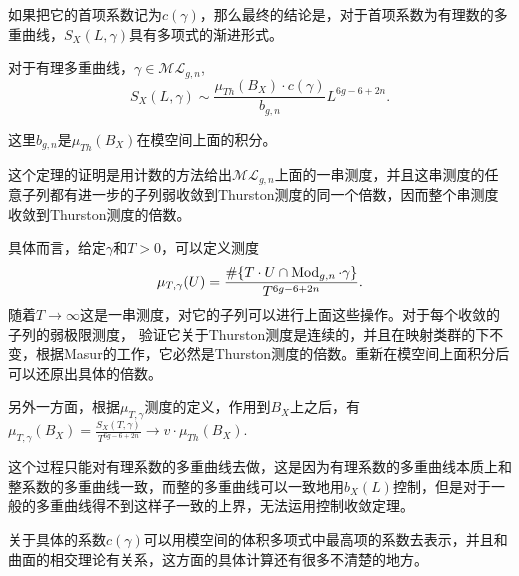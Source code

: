 如果把它的首项系数记为$c(\gamma)$，那么最终的结论是，对于首项系数为有理数的多重曲线，$S_X(L,\gamma)$具有多项式的渐进形式。

\begin{thmb}
对于有理多重曲线，$\gamma\in \mathscr{ML}_{g,n}$, $$
S_X(L,\gamma)\sim \frac{\mu_{Th}(B_X)\cdot c(\gamma)}{b_{g,n}} L^{6g-6+2n}.
$$
\end{thmb}

这里$b_{g,n}$是$\mu_{Th}(B_X)$在模空间上面的积分。

这个定理的证明是用计数的方法给出$\mathscr{ML}_{g,n}$上面的一串测度，并且这串测度的任意子列都有进一步的子列弱收敛到Thurston测度的同一个倍数，因而整个串测度收敛到Thurston测度的倍数。

具体而言，给定$\gamma$和$T>0$，可以定义测度 $$
 \mu_{T,\gamma}(U)=\frac{\#\{T\cdot U\cap \operatorname{Mod}_{g,n}\cdot \gamma \}}{T^{6g-6+2n}}.
 $$
 随着$T\to\infty$这是一串测度，对它的子列可以进行上面这些操作。对于每个收敛的子列的弱极限测度，
 验证它关于Thurston测度是连续的，并且在映射类群的下不变，根据Masur的工作，它必然是Thurston测度的倍数。重新在模空间上面积分后可以还原出具体的倍数。
 
 
 另外一方面，根据$\mu_{T,\gamma}$测度的定义，作用到$B_X$上之后，有$\mu_{T,\gamma}(B_X)=\frac{S_{X}(T,\gamma)}{T^{6g-6+2n}}\to v\cdot \mu_{Th}(B_X)$.
 
 这个过程只能对有理系数的多重曲线去做，这是因为有理系数的多重曲线本质上和整系数的多重曲线一致，而整的多重曲线可以一致地用$b_X(L)$控制，但是对于一般的多重曲线得不到这样子一致的上界，无法运用控制收敛定理。
 
 关于具体的系数$c(\gamma)$可以用模空间的体积多项式中最高项的系数去表示，并且和曲面的相交理论有关系，这方面的具体计算还有很多不清楚的地方。